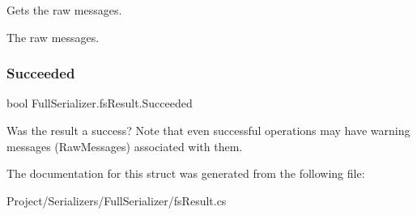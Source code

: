 Gets the raw messages. 

The raw messages.\mbox{\label{struct_full_serializer_1_1fs_result_a09d500a429685b79bec14453423af551}} 
\subsubsection{\texorpdfstring{Succeeded}{Succeeded}}
{\footnotesize\ttfamily bool Full\+Serializer.\+fs\+Result.\+Succeeded\hspace{0.3cm}{\ttfamily [get]}}



Was the result a success? Note that even successful operations may have warning messages ({\ttfamily Raw\+Messages}) associated with them. 



The documentation for this struct was generated from the following file\+:\begin{DoxyCompactItemize}
\item 
Project/\+Serializers/\+Full\+Serializer/fs\+Result.\+cs\end{DoxyCompactItemize}

